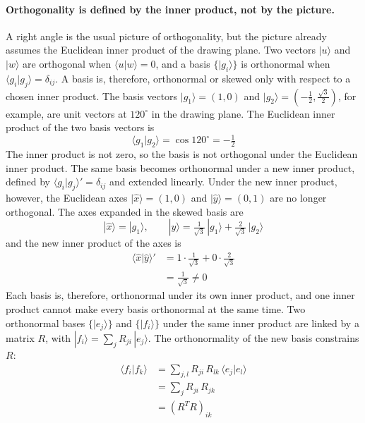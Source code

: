 \documentclass[11pt]{article}      %
\numberwithin{equation}{section}   %
\begin{document}
\paragraph{Orthogonality is defined by the inner product, not by the picture.} A right angle is the usual picture of orthogonality, but the picture already assumes the Euclidean inner product of the drawing plane. Two vectors $|u\rangle$ and $|w\rangle$ are orthogonal when $\langle u | w \rangle = 0$, and a basis $\{|g_i\rangle\}$ is orthonormal when $\langle g_i | g_j \rangle = \delta_{ij}$. A basis is, therefore, orthonormal or skewed only with respect to a chosen inner product. The basis vectors $|g_1\rangle = (1, 0)$ and $|g_2\rangle = (-\tfrac{1}{2}, \tfrac{\sqrt{3}}{2})$, for example, are unit vectors at $120^\circ$ in the drawing plane. The Euclidean inner product of the two basis vectors is
\begin{equation*}
    \langle g_1 | g_2 \rangle = \cos 120^\circ = -\tfrac{1}{2}
\end{equation*}
The inner product is not zero, so the basis is not orthogonal under the Euclidean inner product. The same basis becomes orthonormal under a new inner product, defined by $\langle g_i | g_j \rangle' = \delta_{ij}$ and extended linearly. Under the new inner product, however, the Euclidean axes $|\hat x\rangle = (1,0)$ and $|\hat y\rangle = (0,1)$ are no longer orthogonal. The axes expanded in the skewed basis are
\begin{equation*}
    |\hat x\rangle = |g_1\rangle, \qquad
    |\hat y\rangle = \tfrac{1}{\sqrt{3}}\,|g_1\rangle + \tfrac{2}{\sqrt{3}}\,|g_2\rangle
\end{equation*}
and the new inner product of the axes is
\begin{align*}
    \langle \hat x | \hat y \rangle' &= 1 \cdot \tfrac{1}{\sqrt{3}} + 0 \cdot \tfrac{2}{\sqrt{3}} \\
    &= \tfrac{1}{\sqrt{3}} \neq 0
\end{align*}
Each basis is, therefore, orthonormal under its own inner product, and one inner product cannot make every basis orthonormal at the same time. Two orthonormal bases $\{|e_j\rangle\}$ and $\{|f_i\rangle\}$ under the same inner product are linked by a matrix $R$, with $|f_i\rangle = \sum_j R_{ji}\, |e_j\rangle$. The orthonormality of the new basis constrains $R$:
\begin{align*}
    \langle f_i | f_k \rangle &= \sum_{j,l} R_{ji}\, R_{lk}\, \langle e_j | e_l \rangle \\
    &= \sum_{j} R_{ji}\, R_{jk} \\
    &= (R^{T} R)_{ik}
\end{align*}
\end{document}

